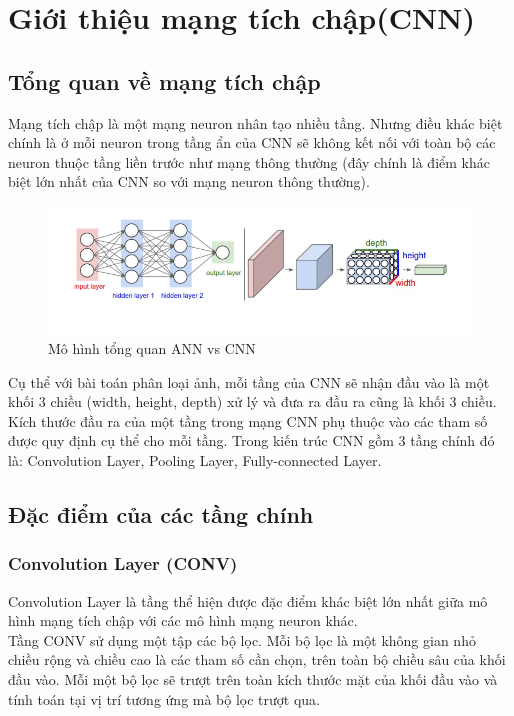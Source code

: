 \documentclass[a4paper,12pt]{report}
\begin{document}
\chapter{Giới thiệu mạng tích chập(CNN)}\label{chap_CNN}
\section{Tổng quan về mạng tích chập}\label{sec_intro_cnn}
Mạng tích chập là một mạng neuron nhân tạo nhiều tầng. Nhưng điều khác biệt chính là ở mỗi neuron trong tầng ẩn của CNN sẽ không kết nối với toàn bộ các neuron thuộc tầng liền trước như mạng thông thường (đây chính là điểm khác biệt lớn nhất của CNN so với mạng neuron thông thường).
\begin{figure}[H]
\includegraphics[scale=0.7]{img1.png}
\caption{Mô hình tổng quan ANN vs CNN}
\end{figure}
Cụ thể với bài toán phân loại ảnh, mỗi tầng của CNN sẽ nhận đầu vào là một khối 3 chiều (width, height, depth) xử lý và đưa ra đầu ra cũng là khối 3 chiều. Kích thước đầu ra của một tầng trong mạng CNN phụ thuộc vào các tham số được quy định cụ thể cho mỗi tầng. Trong kiến trúc CNN gồm 3 tầng chính đó là: Convolution Layer, Pooling Layer, Fully-connected Layer.
\section{Đặc điểm của các tầng chính}
\subsection{Convolution Layer (CONV)}\label{sec_intro_conv}
Convolution Layer là tầng thể hiện được đặc điểm khác biệt lớn nhất giữa mô hình mạng tích chập với các mô hình mạng neuron khác.\\

Tầng CONV sử dụng một tập các bộ lọc. Mỗi bộ lọc là một không gian nhỏ chiều rộng và chiều cao là các tham số cần chọn, trên toàn bộ chiều sâu của khối đầu vào. Mỗi một bộ lọc sẽ trượt trên toàn kích thước mặt của khối đầu vào và tính toán tại vị trí tương ứng mà bộ lọc trượt qua. \\ 
\end{document}
